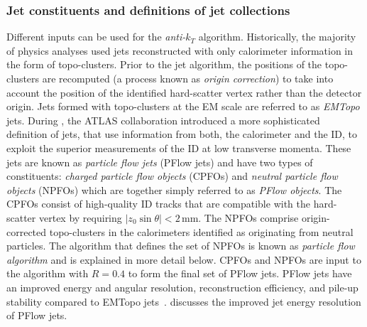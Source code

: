 \subsubsection{Jet constituents and definitions of jet collections}
Different inputs can be used for the \emph{anti-$k_T$} algorithm.
Historically, the majority of physics analyses used jets reconstructed with only calorimeter information in the form of topo-clusters.
Prior to the jet algorithm, the positions of the topo-clusters are recomputed (a process known as \emph{origin correction}) to take into account the position of the identified hard-scatter vertex rather than the detector origin.
Jets formed with topo-clusters at the EM scale are referred to as \emph{EMTopo} jets.
During \RunTwo, the ATLAS collaboration introduced a more sophisticated definition of jets, that use information from both, the calorimeter and the ID, to exploit the superior measurements of the ID at low transverse momenta.
These jets are known as \emph{particle flow jets} (PFlow jets) and have two types of constituents: \emph{charged particle flow objects} (CPFOs) and \emph{neutral particle flow objects} (NPFOs) which are together simply referred to as \emph{PFlow objects}. The CPFOs consist of high-quality ID tracks that are compatible with the hard-scatter vertex by requiring $|z_0 \sin \theta| < 2$\,mm.
The NPFOs comprise origin-corrected topo-clusters in the calorimeters identified as originating from neutral particles. The algorithm that defines the set of NPFOs is known as \emph{particle flow algorithm} and is explained in more detail below. CPFOs and NPFOs are input to the \antikt algorithm with $R = 0.4$ to form the final set of PFlow jets.
PFlow jets have an improved energy and angular resolution, reconstruction efficiency, and pile-up stability compared to EMTopo jets~\cite{PERF-2015-09}.
 discusses the improved jet energy resolution of PFlow jets.

